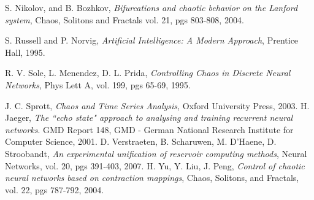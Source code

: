 \documentclass[12pt]{article}
\begin{document}
\begin{thebibliography}{widest-label}
 S. Nikolov, and B. Bozhkov,
 \emph{Bifurcations and chaotic behavior on the Lanford system},
 Chaos, Solitons and Fractals
 vol. 21,
 pgs 803-808,
 2004.

 S. Russell and P. Norvig,
 \emph{Artificial Intelligence: A Modern Approach},
 Prentice Hall,
 1995.

 R. V. Sole, L. Menendez, D. L. Prida,
 \emph{Controlling Chaos in Discrete Neural Networks},
 Phys Lett A,
 vol. 199,
 pgs 65-69,
 1995.

 J. C. Sprott,
 \emph{Chaos and Time Series Analysis},
 Oxford University Press,
 2003.
  H. Jaeger,
  \emph{The ``echo state" approach to analysing and training recurrent neural networks}.
  GMD Report 148, 
  GMD - German National Research Institute for Computer Science,
  2001.
 D. Verstraeten, B. Scharuwen, M. D'Haene, D. Stroobandt,
 \emph{An experimental unification of reservoir computing methods},
 Neural Networks,
 vol. 20,
 pgs 391-403,
 2007.
 H. Yu, Y. Liu, J. Peng,
 \emph{Control of chaotic neural networks based on contraction mappings},
 Chaos, Solitons, and Fractals,
 vol. 22,
 pgs 787-792,
 2004.

\end{thebibliography}
\end{document}
